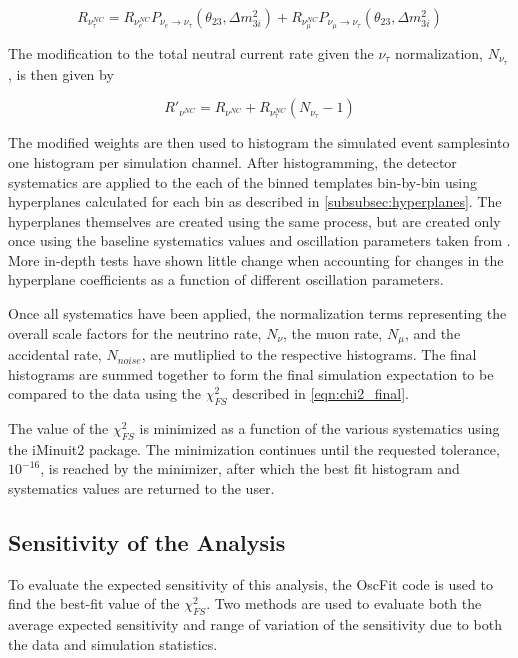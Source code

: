 \begin{equation}
	R_{\nu_\tau^{NC}} = R_{\nu_e^{NC}} P_{\nu_e\rightarrow\nu_\tau}\left(\theta_{23},\Delta m^2_{3i}\right) +  R_{\nu_\mu^{NC}} P_{\nu_\mu\rightarrow\nu_\tau}\left(\theta_{23},\Delta m^2_{3i}\right)
\end{equation}

The modification to the total neutral current rate given the $\nu_\tau$ normalization, $N_{\nu_\tau}$, is then given by

\label{eqn:nutau_nc}
\begin{equation}
	 R\prime_{\nu^{NC}} = R_{\nu^{NC}} +  R_{\nu_\tau^{NC}} \left( N_{\nu_\tau} - 1\right) 
\end{equation}

The modified weights are then used to histogram the simulated event samplesinto one histogram per simulation channel.
After histogramming, the detector systematics are applied to the each of the binned templates bin-by-bin using hyperplanes calculated for each bin as described in \ref{subsubsec:hyperplanes}.
The hyperplanes themselves are created using the same process, but are created only once using the baseline systematics values and oscillation parameters taken from .
More in-depth tests have shown little change when accounting for changes in the hyperplane coefficients as a function of different oscillation parameters.

Once all systematics have been applied, the normalization terms representing the overall scale factors for the neutrino rate, $N_\nu$, the muon rate, $N_\mu$, and the accidental rate, $N_{noise}$, are mutliplied to the respective histograms.
The final histograms are summed together to form the final simulation expectation to be compared to the data using the $\chi^2_{FS}$ described in \ref{eqn:chi2_final}.

The value of the $\chi^2_{FS}$ is minimized as a function of the various systematics using the iMinuit2  package.
The minimization continues until the requested tolerance, $10^{-16}$, is reached by the minimizer, after which the best fit histogram and systematics values are returned to the user.

\subsection{Sensitivity of the Analysis}
To evaluate the expected sensitivity of this analysis, the OscFit code is used to find the best-fit value of the $\chi^2_{FS}$.
Two methods are used to evaluate both the average expected sensitivity and range of variation of the sensitivity due to both the data and simulation statistics.

